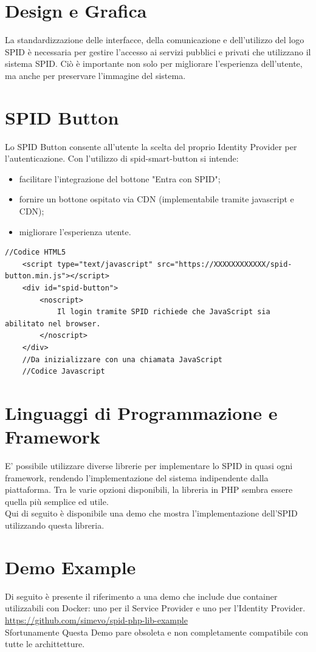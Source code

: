 \section{Design e Grafica}
La standardizzazione delle interfacce, della comunicazione e dell'utilizzo del logo SPID è necessaria per gestire l'accesso ai 
servizi pubblici e privati che utilizzano il sistema SPID. Ciò è importante non solo per migliorare l'esperienza dell'utente, 
ma anche per preservare l'immagine del sistema.

\section{SPID Button}
Lo SPID Button consente all'utente la scelta del proprio Identity Provider per l'autenticazione.
Con l'utilizzo di spid-smart-button si intende:
\begin{itemize}
    \item facilitare l'integrazione del bottone "Entra con SPID";
    \item fornire un bottone ospitato via CDN (implementabile tramite javascript e CDN);
    \item migliorare l'esperienza utente.
\end{itemize}


\begin{lstlisting}[style=htmlcssjs]
    //Codice HTML5
    <script type="text/javascript" src="https://XXXXXXXXXXXX/spid-button.min.js"></script>
    <div id="spid-button">
        <noscript> 
            Il login tramite SPID richiede che JavaScript sia abilitato nel browser.
        </noscript>
    </div>
    //Da inizializzare con una chiamata JavaScript
    //Codice Javascript
\end{lstlisting}

\section{Linguaggi di Programmazione e Framework}
E' possibile utilizzare diverse librerie per implementare lo SPID in quasi ogni framework, rendendo l'implementazione del sistema 
indipendente dalla piattaforma. Tra le varie opzioni disponibili, la libreria in PHP sembra essere quella più semplice ed utile. \\
Qui di seguito è disponibile una demo che mostra l'implementazione dell'SPID utilizzando questa libreria.

\section{Demo Example}
Di seguito è presente il riferimento a una demo che include due container utilizzabili con Docker: uno per il Service Provider 
e uno per l'Identity Provider.
\\ \url{https://github.com/simevo/spid-php-lib-example}
\\ Sfortunamente Questa Demo pare obsoleta e non completamente compatibile con tutte le archittetture.


